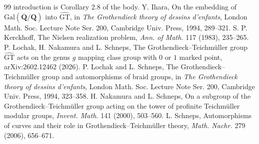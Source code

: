 \documentclass[11pt,a4paper]{article}
\theoremstyle{plain}
\theoremstyle{definition}
\theoremstyle{remark}
\newcommand{\GT}{\widehat{\mathrm{GT}}}
\begin{document}
\begin{thebibliography}{99}
introduction is Corollary 2.8 of the body.
 Y. Ihara, On the embedding of $\mathrm{Gal}(\overline{\mathbf Q}/\mathbf Q)$ into $\GT$, in \emph{The
Grothendieck theory of dessins d'enfants}, London Math. Soc. Lecture Note Ser. 200, Cambridge Univ. Press, 1994,
289--321.
 S. P. Kerckhoff, The Nielsen realization problem, \emph{Ann. of Math.} 117 (1983), 235--265.
 P. Lochak, H. Nakamura and L. Schneps, The Grothendieck--Teichm\"uller group $\GT$ acts on the genus
$g$ mapping class group with $0$ or $1$ marked point, arXiv:2602.12462 (2026).
 P. Lochak and L. Schneps, The Grothendieck--Teichm\"uller group and automorphisms of braid groups, in
\emph{The Grothendieck theory of dessins d'enfants}, London Math. Soc. Lecture Note Ser. 200, Cambridge Univ.
Press, 1994, 323--358.
 H. Nakamura and L. Schneps, On a subgroup of the Grothendieck--Teichm\"uller group acting on the
tower of profinite Teichm\"uller modular groups, \emph{Invent. Math.} 141 (2000), 503--560.
 L. Schneps, Automorphisms of curves and their role in Grothendieck--Teichm\"uller theory, \emph{Math.
Nachr.} 279 (2006), 656--671.
\end{thebibliography}
\end{document}
